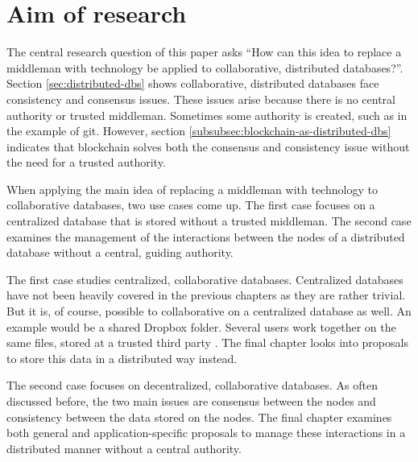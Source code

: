 \chapter{Aim of research}

\iffalse
- start with consensus and consistency in col. distr. dbs => because no central authority
- pivot into main idea: have technology replace an indispensable middleman. As discussed in \ref{subsec:examples-distributed-dbs}, blockchains solve both issues very well. 
- to apply the main idea to collaborative databases: two approaches. First a centralized collaborative database can be stored without a middleman. Second, the interaction between a nodes of a distributed collaborative database can be managed without a middleman
- For the first approach, the final chapter looks into proposals to store data in a distributed manner. Every proposal is examined on advantages, disadvantages, viability and current implementations.
- Concerning the second approach, the last chapter focuses on proposals to manage the interaction 
\fi

The central research question of this paper asks ``How can this idea to replace a middleman with technology be applied to collaborative, distributed databases?''. Section \ref{sec:distributed-dbs} shows collaborative, distributed databases face consistency and consensus issues. These issues arise because there is no central authority or trusted middleman. Sometimes some authority is created, such as in the example of git. However, section \ref{subsubsec:blockchain-as-distributed-dbs} indicates that blockchain solves both the consensus and consistency issue without the need for a trusted authority.

When applying the main idea of replacing a middleman with technology to collaborative databases, two use cases come up. The first case focuses on a centralized database that is stored without a trusted middleman. The second case examines the management of the interactions between the nodes of a distributed database without a central, guiding authority.

The first case studies centralized, collaborative databases. Centralized databases have not been heavily covered in the previous chapters as they are rather trivial. But it is, of course, possible to collaborative on a centralized database as well. An example would be a shared Dropbox folder. Several users work together on the same files, stored at a trusted third party \cite{dropbox-sharing}. The final chapter looks into proposals to store this data in a distributed way instead.

The second case focuses on decentralized, collaborative databases. As often discussed before, the two main issues are consensus between the nodes and consistency between the data stored on the nodes. The final chapter examines both general and application-specific proposals to manage these interactions in a distributed manner without a central authority.


